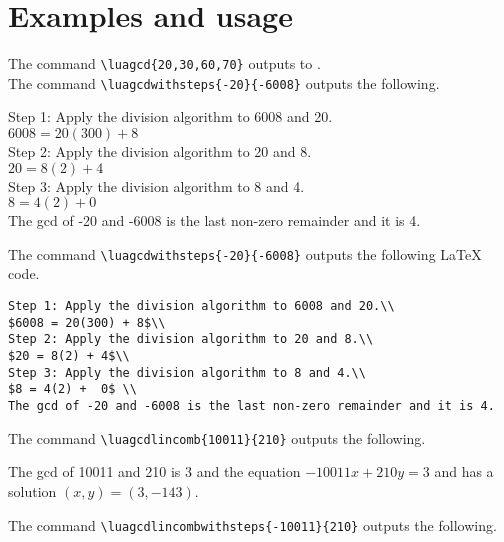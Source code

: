 \documentclass{article}
\begin{document}
\section{Examples and usage}
The command \verb|\luagcd{20,30,60,70}| outputs to .  \\
The command \verb|\luagcdwithsteps{-20}{-6008}| outputs the following.\\
\begin{framed}
\noindent Step 1: Apply the division algorithm to 6008 and 20.\\
$6008 = 20(300) + 8$\\
Step 2: Apply the division algorithm to 20 and 8.\\
$20 = 8(2) + 4$\\
Step 3: Apply the division algorithm to 8 and 4.\\
$8 = 4(2) +  0$ \\
The gcd of -20 and -6008 is the last non-zero remainder and it is 4.
\end{framed}

The command \verb|\luagcdwithsteps{-20}{-6008}| outputs  the following LaTeX code.
\begin{lstlisting}
Step 1: Apply the division algorithm to 6008 and 20.\\
$6008 = 20(300) + 8$\\
Step 2: Apply the division algorithm to 20 and 8.\\
$20 = 8(2) + 4$\\
Step 3: Apply the division algorithm to 8 and 4.\\
$8 = 4(2) +  0$ \\
The gcd of -20 and -6008 is the last non-zero remainder and it is 4.
\end{lstlisting}

The command \verb|\luagcdlincomb{10011}{210}| outputs the following.

\begin{framed} \noindent The gcd of 10011 and 210 is 3 and the equation $-10011x + 210y = 3$ 
and has a solution $(x,y) =  (3,-143)$.\end{framed}

The command \verb|\luagcdlincombwithsteps{-10011}{210}| outputs  the following.
 
\end{document}
